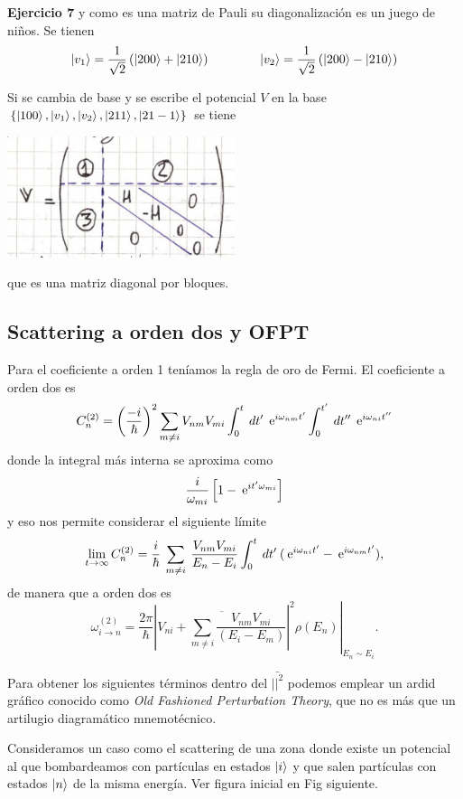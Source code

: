\documentclass[10pt,oneside]{CBFT_book}
\begin{document}
\begin{ejemplo}{\bf Ejercicio 7}
y como es una matriz de Pauli su diagonalización es un juego de niños. Se tienen
\[
	\Ket{v_1} = \frac{1}{\sqrt{2}} \left( \Ket{200} + \Ket{210} \right)
	\qquad \qquad 
	\Ket{v_2} = \frac{1}{\sqrt{2}} \left( \Ket{200} - \Ket{210} \right)
\]

Si se cambia de base y se escribe el potencial $V$ en la base $\{ \Ket{100}, \Ket{v_1}, 
\Ket{v_2}, \Ket{211}, \Ket{21-1} \}$ se tiene

\includegraphics[width=0.5\textwidth]{images/fig_ft2_ejercicio7C.jpg}

que es una matriz diagonal por bloques. 
 
\end{ejemplo}

\subsection{Scattering a orden dos y OFPT}

Para el coeficiente a orden 1 teníamos la regla de oro de Fermi.
El coeficiente a orden dos es
\[
	C_n^{(2)} = \left( \frac{ -i }{ \hbar } \right)^2 \sum_{m \neq i} V_{nm} V_{mi}
	\int_0^t \: dt' \: \:\mathrm{e}^{ i \omega_{nm} t'} 
	\int_0^{t'} \: dt'' \: \:\mathrm{e}^{ i \omega_{ni} t''}
\]
donde la integral más interna se aproxima como
\[
	\frac{i}{\omega_{mi}} \left[ 1 - \:\mathrm{e}^{ i t' \omega_{mi} } \right]
\]
y eso nos permite considerar el siguiente límite
\[
	\lim_{t \to \infty} C_n^{(2)} = 
	\frac{i}{\hbar} \: \sum_{m \neq i} \: \frac{V_{nm} V_{mi}}{E_n - E_i}
	\int_0^t \: dt' \: ( \:\mathrm{e}^{ i \omega_{ni} t'} - \:\mathrm{e}^{ i \omega_{nm} t'} ),
\]
de manera que a orden dos es
\[
	\omega_{i\to n}^{(2)} = \frac{2\pi}{\hbar}\left. \left| \overline{ V_{ni} + \sum_{m\neq i} 
	\frac{V_{nm}V_{mi}}{(E_i-E_m)}} \right|^2 \rho(E_n) \right|_{E_n\sim E_i}.
\]

Para obtener los siguientes términos dentro del $\bar{||^2}$ podemos emplear un ardid gráfico conocido como 
{\it Old Fashioned Perturbation Theory}, que no es más que un artilugio diagramático mnemotécnico.

Consideramos un caso como el scattering de una zona donde existe un potencial al que bombardeamos con
partículas en estados $\Ket{i}$ y que salen partículas con estados $\Ket{n}$ de la misma energía.
Ver figura inicial en Fig siguiente.
\end{document}
